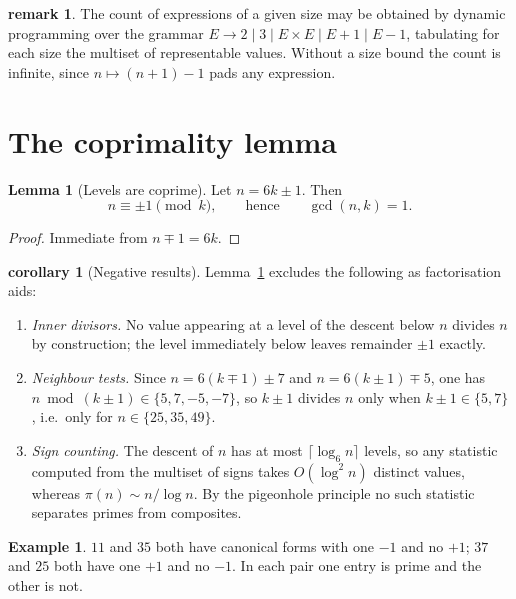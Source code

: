 \documentclass[11pt]{article}
\theoremstyle{definition}
\newtheorem{lemma}{Lemma}
\newtheorem{example}{Example}
\newtheorem{remark}{remark}
\newtheorem{corollary}{corollary}
\begin{document}
\begin{remark}
The count of expressions of a given size may be obtained by dynamic
programming over the grammar
$E \to 2 \mid 3 \mid E\times E \mid E+1 \mid E-1$,
tabulating for each size the multiset of representable values. Without a size
bound the count is infinite, since $n \mapsto (n+1)-1$ pads any expression.
\end{remark}

\section{The coprimality lemma}

\begin{lemma}[Levels are coprime]\label{lem:coprime}
Let $n = 6k \pm 1$. Then
\[
  n \equiv \pm 1 \pmod{k}, \qquad\text{hence}\qquad \gcd(n,k)=1 .
\]
\end{lemma}

\begin{proof}
Immediate from $n \mp 1 = 6k$.
\end{proof}

\begin{corollary}[Negative results]\label{cor:negative}
Lemma~\ref{lem:coprime} excludes the following as factorisation aids:
\begin{enumerate}
  \item \emph{Inner divisors.} No value appearing at a level of the descent
        below $n$ divides $n$ by construction; the level immediately below
        leaves remainder $\pm 1$ exactly.
  \item \emph{Neighbour tests.} Since $n = 6(k\mp1) \pm 7$ and
        $n = 6(k\pm1) \mp 5$, one has $n \bmod (k\pm1) \in \{5,7,-5,-7\}$, so
        $k\pm1$ divides $n$ only when $k\pm1 \in \{5,7\}$, i.e.\ only for
        $n \in \{25,35,49\}$.
  \item \emph{Sign counting.} The descent of $n$ has at most
        $\lceil\log_6 n\rceil$ levels, so any statistic computed from the
        multiset of signs takes $O(\log^2 n)$ distinct values, whereas
        $\pi(n) \sim n/\log n$. By the pigeonhole principle no such statistic
        separates primes from composites.
\end{enumerate}
\end{corollary}

\begin{example}
$11$ and $35$ both have canonical forms with one $-1$ and no $+1$; $37$ and
$25$ both have one $+1$ and no $-1$. In each pair one entry is prime and the
other is not.
\end{example}
\end{document}

